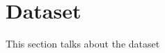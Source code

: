 \documentclass[../main.tex]{subfiles}
\begin{document}
\section{Dataset}
    
    This section talks about the dataset

    
\end{document}
